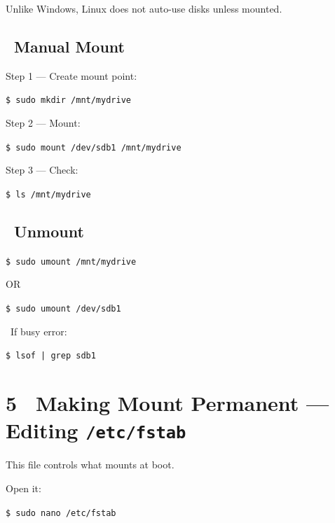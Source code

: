 \documentclass[12pt]{article}
\newcommand{\warningicon}{\faExclamationTriangle}
\begin{document}
Unlike Windows, Linux does not auto-use disks unless mounted.

\subsection*{\faFolderOpen\ Manual Mount}

Step 1 — Create mount point:

\begin{highlightbox}
\texttt{\$ sudo mkdir /mnt/mydrive}
\end{highlightbox}

Step 2 — Mount:

\begin{highlightbox}
\texttt{\$ sudo mount /dev/sdb1 /mnt/mydrive}
\end{highlightbox}

Step 3 — Check:

\begin{highlightbox}
\texttt{\$ ls /mnt/mydrive}
\end{highlightbox}

\subsection*{\faEject\ Unmount}

\begin{highlightbox}
\texttt{\$ sudo umount /mnt/mydrive}
\end{highlightbox}

OR

\begin{highlightbox}
\texttt{\$ sudo umount /dev/sdb1}
\end{highlightbox}

\begin{warningbox}
\warningicon\ If busy error:
\begin{highlightbox}
\texttt{\$ lsof | grep sdb1}
\end{highlightbox}
\end{warningbox}

\section*{5 \faFile\ Making Mount Permanent — Editing \texttt{/etc/fstab}}

This file controls what mounts at boot.

Open it:

\begin{highlightbox}
\texttt{\$ sudo nano /etc/fstab}
\end{highlightbox}
\end{document}

